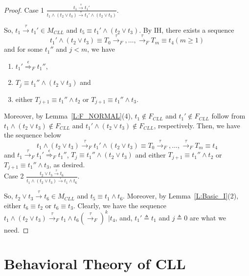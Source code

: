 \documentclass{elsarticle}
\theoremstyle{plain}
\theoremstyle{definition}
\begin{document}
\begin{proof}
   \noindent Case 1 $\frac{t_1 \stackrel{\tau}{\longrightarrow}t_1'}{t_1 \wedge ( t_2 \vee t_3) \stackrel{\tau}{\longrightarrow}t_1'\wedge ( t_2 \vee t_3) }$.

    So, $t_1 \stackrel{\tau}{\longrightarrow}t_1' \in M_{CLL}$ and $t_5 \equiv t_1'\wedge ( t_2 \vee t_3)$.
    By IH, there exists a sequence
   \[t_1' \wedge ( t_2 \vee t_3) \equiv T_0 \stackrel{\tau}{\longrightarrow}_F,\dots,\stackrel{\tau}{\longrightarrow}_F T_m \equiv t_4 (m \geq 1)\]
    and for some $t_1''$ and $j<m$, we have
    \begin{enumerate}
      \item  $t_1' \stackrel{\epsilon}{\Longrightarrow}_F t_1''$,
      \item $T_j\equiv t_1'' \wedge ( t_2 \vee t_3)$ and
      \item either $T_{j+1}\equiv t_1'' \wedge t_2 $ or $T_{j+1}\equiv t_1'' \wedge  t_3$.
    \end{enumerate}
   Moreover, by Lemma~\ref{L:F_NORMAL}(4), $t_1\notin F_{CLL}$ and $t_1' \notin F_{CLL}$ follow from $t_1 \wedge (t_2 \vee t_3) \notin F_{CLL}$ and $t_1' \wedge (t_2 \vee t_3) \notin F_{CLL}$, respectively.
   Then, we have the sequence below
   \[t_1 \wedge ( t_2 \vee t_3) \stackrel{\tau}{\longrightarrow}_F t_1' \wedge ( t_2 \vee t_3) \equiv T_0 \stackrel{\tau}{\longrightarrow}_F,\dots,\stackrel{\tau}{\longrightarrow}_F T_m \equiv t_4\]
   and $t_1 \stackrel{\tau}{\longrightarrow}_F  t_1' \stackrel{\epsilon}{\Longrightarrow}_F t_1''$, $T_j\equiv t_1'' \wedge ( t_2 \vee t_3)$ and either $T_{j+1}\equiv t_1'' \wedge t_2 $ or $T_{j+1}\equiv t_1'' \wedge  t_3$, as desired.\\

   \noindent  Case 2 $\frac{t_2 \vee t_3 \stackrel{\tau}{\longrightarrow}t_6}{t_1 \wedge ( t_2 \vee t_3) \stackrel{\tau}{\longrightarrow}t_1\wedge t_6}$.

    So, $t_2 \vee t_3 \stackrel{\tau}{\longrightarrow}t_6 \in M_{CLL}$ and $t_5 \equiv t_1\wedge t_6$.
    Moreover, by Lemma~\ref{L:Basic_I}(2), either $t_6\equiv t_2$ or $t_6 \equiv t_3$. Clearly, we have the sequence $t_1 \wedge (t_2 \vee t_3) \stackrel{\tau}{\longrightarrow}_F t_1 \wedge t_6 (\stackrel{\tau}{\longrightarrow}_F)^{k}|t_4$, and, $t_1' \triangleq t_1$ and $j\triangleq0$ are what we need.
\end{proof}


\section{Behavioral Theory of CLL}
\end{document}
